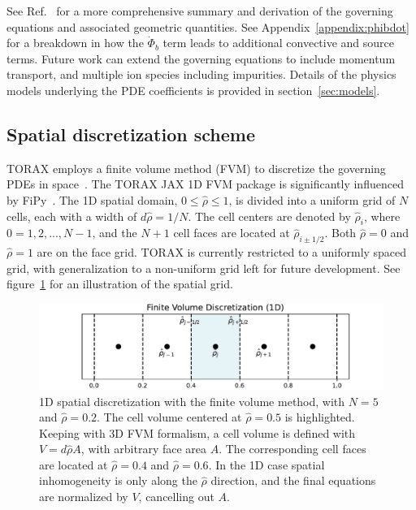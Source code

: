 \documentclass[aps, reprint, nofootinbib]{revtex4-2}
\newcommand{\rnorm}{\hat{\rho}}
\newcommand{\phibdot}{\dot{\Phi}_b}
\begin{document}
See Ref.~\cite{felici:2011} for a more comprehensive summary and derivation of the governing equations and associated geometric quantities. See Appendix~\ref{appendix:phibdot} for a breakdown in how the $\phibdot$ term leads to additional convective and source terms. Future work can extend the governing equations to include momentum transport, and multiple ion species including impurities. Details of the physics models underlying the PDE coefficients is provided in section~\ref{sec:models}.

\subsection{Spatial discretization scheme}
\label{sec:fvm}
TORAX employs a finite volume method (FVM) to discretize the governing PDEs in space~\cite{eymard:2000}. The TORAX JAX 1D FVM package is significantly influenced by FiPy~\cite{FiPy:2009}. The 1D spatial domain, $0 \leq \rnorm \leq 1$, is divided into a uniform grid of $N$ cells, each with a width of $d \rnorm = 1/N$.  The cell centers are denoted by  $\rnorm_i$,  where  $0 = 1, 2,..., N-1$, and the $N+1$ cell faces are located at $\rnorm_{i\pm1/2}$.  Both $\rnorm=0$ and $\rnorm=1$ are on the face grid. TORAX is currently restricted to a uniformly spaced grid, with generalization to a non-uniform grid left for future development. See figure~\ref{figure:fvm} for an illustration of the spatial grid.

\begin{figure}[hbt]
    \includegraphics[width=1.0\linewidth]{figure2_fvm.pdf}
    \caption{\footnotesize 1D spatial discretization with the finite volume method, with $N=5$ and $\rnorm=0.2$. The cell volume centered at $\rnorm=0.5$ is highlighted. Keeping with 3D FVM formalism, a cell volume is defined with $V=d\hat{\rho}A$, with arbitrary face area $A$. The corresponding cell faces are located at $\rnorm=0.4$ and $\rnorm=0.6$. In the 1D case spatial inhomogeneity is only along the $\rnorm$ direction, and the final equations are normalized by $V$, cancelling out $A$.}
    \label{figure:fvm}
\end{figure}
\end{document}
